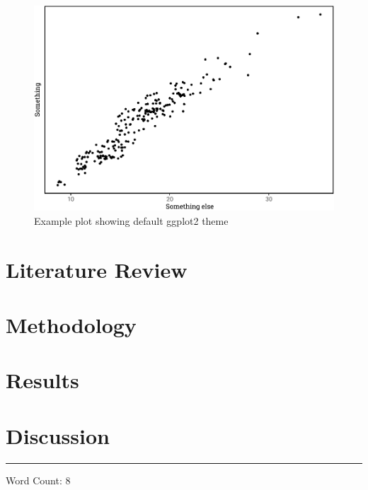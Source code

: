\documentclass[a4paper, notitlepage]{extreport}
\begin{document}
\begin{figure}[tb]

{\centering \includegraphics[width=.75\linewidth]{skeleton_files/figure-latex/plot-1} 

}

\caption{Example plot showing default ggplot2 theme}\label{fig:plot}
\end{figure}

\lipsum

\hypertarget{literature-review}{%
\chapter{Literature Review}\label{literature-review}}

\lipsum

\hypertarget{methodology}{%
\chapter{Methodology}\label{methodology}}

\lipsum

\hypertarget{results}{%
\chapter{Results}\label{results}}

\lipsum

\hypertarget{discussion}{%
\chapter{Discussion}\label{discussion}}

\lipsum

\nocite{tidyverse,devtools,Hmisc,PerformanceAnalytics,ggthemes,RStoolbox,broom,viridis,viridisLite,ggpubr,magrittr,sf,kableExtra,scales,lidR,raster,nvimcom,varhandle,future,rgdal,pbapply,cowplot,bibtex,benchmarkme,parallel,showtext,data.table,wesanderson}
\noindent

\rule{2cm}{0.4pt}

Word Count: 8


\linespread{1}

\end{document}
